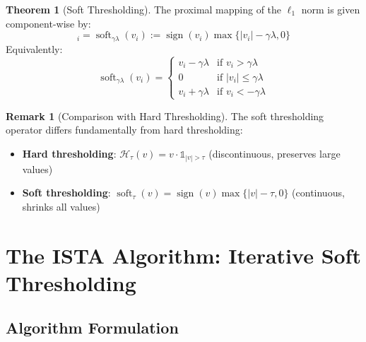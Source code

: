 \documentclass[12pt]{article}
\renewcommand{\vec}[1]{\mathbf{#1}}
\DeclareMathOperator{\prox}{prox}
\DeclareMathOperator{\sign}{sign}
\DeclareMathOperator{\soft}{soft}
\newcommand{\norm}[1]{\left\lVert#1\right\rVert}
\theoremstyle{definition}
\newtheorem{theorem}{Theorem}[section]
\newtheorem{remark}{Remark}[section]
\begin{document}
\begin{theorem}[Soft Thresholding]
    The proximal mapping of the $\ell_1$ norm is given component-wise by:
    \begin{equation}
        [\prox_{\gamma\lambda\norm{\cdot}_1}(\vec{v})]_i = \soft_{\gamma\lambda}(v_i) := \sign(v_i)\max\{|v_i| - \gamma\lambda, 0\}
        \label{eq:soft_threshold}
    \end{equation}
    Equivalently:
    \begin{equation}
        \soft_{\gamma\lambda}(v_i) = \begin{cases}
            v_i - \gamma\lambda & \text{if } v_i > \gamma\lambda      \\
            0                   & \text{if } |v_i| \leq \gamma\lambda \\
            v_i + \gamma\lambda & \text{if } v_i < -\gamma\lambda
        \end{cases}
    \end{equation}
\end{theorem}

\begin{remark}[Comparison with Hard Thresholding]
    The soft thresholding operator differs fundamentally from hard thresholding:
    \begin{itemize}
        \item \textbf{Hard thresholding}: $\mathcal{H}_\tau(v) = v \cdot \mathbb{1}_{|v| > \tau}$ (discontinuous, preserves large values)
        \item \textbf{Soft thresholding}: $\soft_\tau(v) = \sign(v)\max\{|v|-\tau, 0\}$ (continuous, shrinks all values)
    \end{itemize}
\end{remark}


\newpage
\section{The ISTA Algorithm: Iterative Soft Thresholding}

\subsection{Algorithm Formulation}
\end{document}
